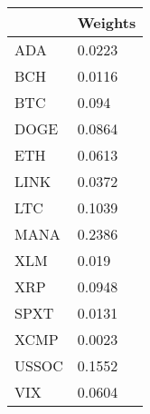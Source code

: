 \begin{tabular}{ll}
\toprule
 & Weights \\
\midrule
ADA & 0.0223 \\
BCH & 0.0116 \\
BTC & 0.094 \\
DOGE & 0.0864 \\
ETH & 0.0613 \\
LINK & 0.0372 \\
LTC & 0.1039 \\
MANA & 0.2386 \\
XLM & 0.019 \\
XRP & 0.0948 \\
SPXT & 0.0131 \\
XCMP & 0.0023 \\
USSOC & 0.1552 \\
VIX & 0.0604 \\
\bottomrule
\end{tabular}
